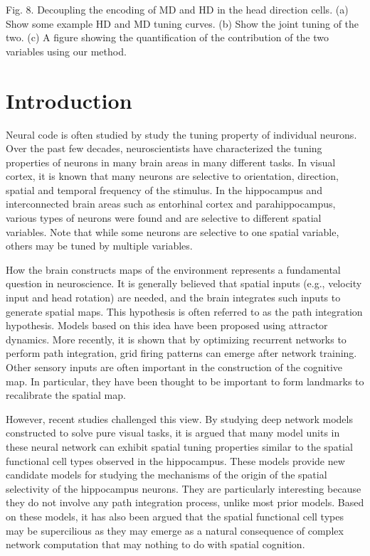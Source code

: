 \documentclass[11pt]{article}
\begin{document}
Fig. 8. Decoupling the encoding of MD and HD in the head direction cells. (a) Show some example HD and MD tuning curves. (b) Show the joint tuning of the two. (c) A figure showing the quantification of the contribution of the two variables using our method. 

\newpage
\section{Introduction}

Neural code is often studied by study the tuning property of individual neurons. Over the past few decades, neuroscientists have characterized the tuning properties of neurons in many brain areas in many different tasks. In visual cortex, it is known that many neurons are selective to orientation, direction, spatial and temporal frequency of the stimulus. In the hippocampus and interconnected brain areas such as entorhinal cortex and parahippocampus, various types of neurons were found and are selective to different spatial variables. Note that while some neurons are selective to one spatial variable, others may be tuned by multiple variables. 



How the brain constructs maps of the environment represents a fundamental question in neuroscience. It is generally believed that spatial inputs (e.g., velocity input and head rotation) are needed, and the brain integrates such inputs to generate spatial maps. This hypothesis is often referred to as the path integration hypothesis. Models based on this idea have been proposed using attractor dynamics. More recently, it is shown that by optimizing recurrent networks to perform path integration, grid firing patterns can emerge after network training. Other sensory inputs are often important in the construction of the cognitive map. In particular, they have been thought to be important to form landmarks to recalibrate the spatial map. 

However, recent studies challenged this view. By studying deep network models constructed to solve pure visual tasks, it is argued that many model units in these neural network can exhibit spatial tuning properties similar to the spatial functional cell types observed in the hippocampus. These models provide new candidate models for studying the mechanisms of the origin of the spatial selectivity of the hippocampus neurons. They are particularly interesting because they do not involve 
any path integration process, unlike most prior models. 
Based on these models, it has also been argued that the spatial functional cell types may be supercilious as they may emerge as a natural consequence of complex network computation that may nothing to do with spatial cognition. 
\end{document}
